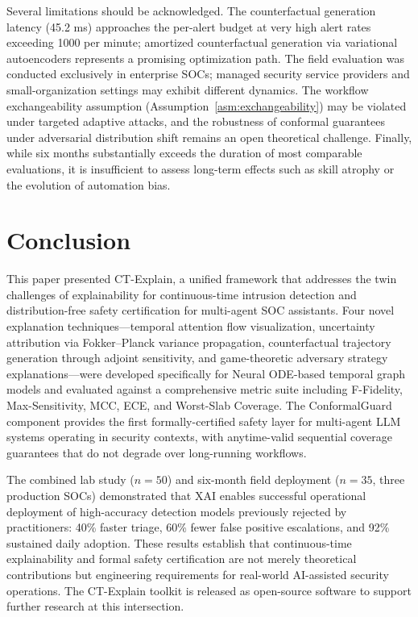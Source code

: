 \documentclass[preprint,review,12pt]{elsarticle}
\begin{document}
Several limitations should be acknowledged. The counterfactual generation latency (45.2 ms) approaches the per-alert budget at very high alert rates exceeding 1000 per minute; amortized counterfactual generation via variational autoencoders represents a promising optimization path. The field evaluation was conducted exclusively in enterprise SOCs; managed security service providers and small-organization settings may exhibit different dynamics. The workflow exchangeability assumption (Assumption~\ref{asm:exchangeability}) may be violated under targeted adaptive attacks, and the robustness of conformal guarantees under adversarial distribution shift remains an open theoretical challenge. Finally, while six months substantially exceeds the duration of most comparable evaluations, it is insufficient to assess long-term effects such as skill atrophy or the evolution of automation bias.


\section{Conclusion}
\label{sec:conclusion}

This paper presented CT-Explain, a unified framework that addresses the twin challenges of explainability for continuous-time intrusion detection and distribution-free safety certification for multi-agent SOC assistants. Four novel explanation techniques---temporal attention flow visualization, uncertainty attribution via Fokker--Planck variance propagation, counterfactual trajectory generation through adjoint sensitivity, and game-theoretic adversary strategy explanations---were developed specifically for Neural ODE-based temporal graph models and evaluated against a comprehensive metric suite including F-Fidelity, Max-Sensitivity, MCC, ECE, and Worst-Slab Coverage. The ConformalGuard component provides the first formally-certified safety layer for multi-agent LLM systems operating in security contexts, with anytime-valid sequential coverage guarantees that do not degrade over long-running workflows.

The combined lab study ($n = 50$) and six-month field deployment ($n = 35$, three production SOCs) demonstrated that XAI enables successful operational deployment of high-accuracy detection models previously rejected by practitioners: 40\% faster triage, 60\% fewer false positive escalations, and 92\% sustained daily adoption. These results establish that continuous-time explainability and formal safety certification are not merely theoretical contributions but engineering requirements for real-world AI-assisted security operations. The CT-Explain toolkit is released as open-source software to support further research at this intersection.
\end{document}
